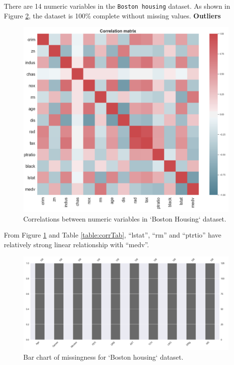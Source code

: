 \documentclass[letterpaper,12pt,twoside,]{pinp}
\begin{document}
There are 14 numeric variables in the \texttt{Boston\ housing} dataset.
As shown in Figure \ref{fig:missHouse}, the dataset is 100\% complete
without missing values. \textbf{Outliers}

\begin{figure}
\includegraphics[width=1\linewidth]{house_corr.png}
\centering
\caption{Correlations between numeric variables in `Boston Housing` dataset.}
\label{fig:corrHouse}
\end{figure}

From Figure \ref{fig:corrHouse} and Table \ref{table:corrTab},
``lstat'', ``rm'' and ``ptrtio'' have relatively strong linear
relationship with ``medv''.

\begin{figure}
\includegraphics[width=1\linewidth]{miss_house.png}
\centering
\caption{Bar chart of missingness for `Boston housing` dataset.}
\label{fig:missHouse}
\end{figure}
\end{document}
